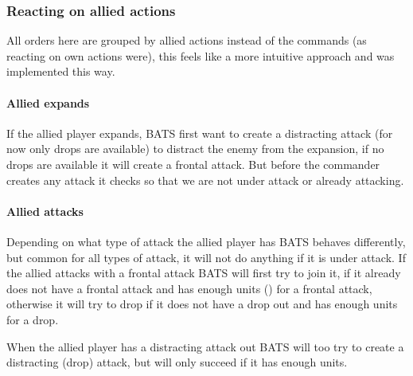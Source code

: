 \subsubsection{Reacting on allied actions}
All orders here are grouped by allied actions instead of the commands (as reacting on own actions were), this feels like a more intuitive approach and was implemented this way.

\paragraph{Allied expands}
If the allied player expands, BATS first want to create a distracting attack (for now only drops are available) to distract the enemy from the expansion, if no drops are available it will create a frontal attack. But before the commander creates any attack it checks so that we are not under attack or already attacking.

\paragraph{Allied attacks}
Depending on what type of attack the allied player has BATS behaves differently, but common for all types of attack, it will not do anything if it is under attack. If the allied attacks with a frontal attack BATS will first try to join it, if it already does not have a frontal attack and has enough units (\classificationFrontalAttackUnitsMin) for a frontal attack, otherwise it will try to drop if it does not have a drop out and has enough units for a drop.

When the allied player has a distracting attack out BATS will too try to create a distracting (drop) attack, but will only succeed if it has enough units.
